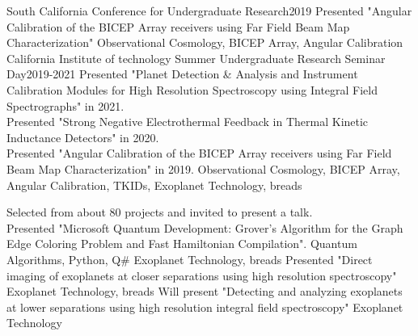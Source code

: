 \begin{projects}
	\project
	{South California Conference for Undergraduate Research}{2019}
	{}
	{Presented "Angular Calibration of the BICEP Array receivers using Far Field Beam Map Characterization"}
	{Observational Cosmology, BICEP Array, Angular Calibration}
	\project
	{California Institute of technology Summer Undergraduate Research Seminar Day}{2019-2021}
	{  }
	{
	Presented "Planet Detection \& Analysis and Instrument Calibration Modules for High Resolution Spectroscopy using Integral Field Spectrographs" in 2021.
	\\
	Presented "Strong Negative Electrothermal Feedback in Thermal Kinetic Inductance Detectors" in 2020.
	\\
	Presented "Angular Calibration of the BICEP Array receivers using Far Field Beam Map Characterization" in 2019.}
	{Observational Cosmology, BICEP Array, Angular Calibration, TKIDs, Exoplanet Technology, breads}
\end{projects}
\begin{projects}
	{Selected from about 80 projects and invited to present a talk. \\
	Presented "Microsoft Quantum Development: Grover's Algorithm for the Graph Edge Coloring Problem and Fast Hamiltonian Compilation".}
	{Quantum Algorithms, Python, Q\#}
	{}
	{Exoplanet Technology, breads}
	{Presented "Direct imaging of exoplanets at closer separations using high resolution spectroscopy"}
	{Exoplanet Technology, breads}
	{Will present "Detecting and analyzing exoplanets at lower separations using high resolution integral field spectroscopy"}
	{Exoplanet Technology}
\end{projects}